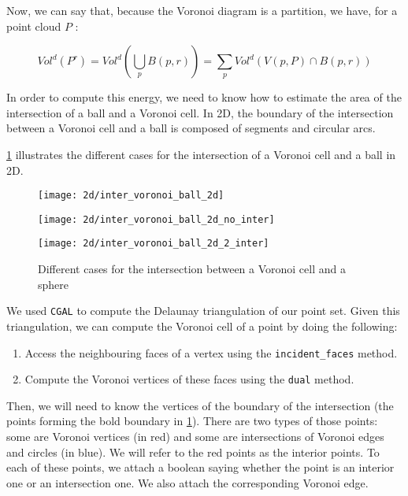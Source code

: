 Now, we can say that, because the Voronoi diagram is a partition, we have, for a
point cloud $ P $ :

$$ Vol^d(P^r) = Vol^d(\bigcup_p B(p, r)) = \sum_p Vol^d(V(p, P) \cap B(p, r)) $$

In order to compute this energy, we need to know how to estimate the area of the
intersection of a ball and a Voronoi cell. In 2D, the boundary of the
intersection between a Voronoi cell and a ball is composed of segments and
circular arcs.

\ref{fig:inter_voronoi_ball_2d} illustrates the different cases for the
intersection of a Voronoi cell and a ball in 2D.

\begin{figure}[h]
    \centering
    \begin{minipage}{0.32\linewidth}
        \centering
        \texttt{[image: 2d/inter\_voronoi\_ball\_2d]}
        \label{fig:inter_voronoi_ball_2d:a}
    \end{minipage}
    \begin{minipage}{0.32\linewidth}
        \centering
        \texttt{[image: 2d/inter\_voronoi\_ball\_2d\_no\_inter]}
        \label{fig:inter_voronoi_ball_2d:b}
    \end{minipage}
    \begin{minipage}{0.32\linewidth}
        \centering
        \texttt{[image: 2d/inter\_voronoi\_ball\_2d\_2\_inter]}
        \label{fig:inter_voronoi_ball_2d:c}
    \end{minipage}

   \caption{Different cases for the intersection between a Voronoi cell and a sphere}
   \label{fig:inter_voronoi_ball_2d}
\end{figure}

We used \texttt{CGAL} to compute the Delaunay triangulation of our point set.
Given this triangulation, we can compute the Voronoi cell of a point by doing
the following:
\begin{enumerate}
    \item Access the neighbouring faces of a vertex using the
        \texttt{incident\_faces} method.
    \item Compute the Voronoi vertices of these faces using the \texttt{dual}
        method.
\end{enumerate}

Then, we will need to know the vertices of the boundary of the intersection (the
points forming the bold boundary in \ref{fig:inter_voronoi_ball_2d}). There are
two types of those points: some are Voronoi vertices (in red) and some are
intersections of Voronoi edges and circles (in blue). We will refer to the red
points as the interior points. To each of these points, we attach a boolean
saying whether the point is an interior one or an intersection one. We also
attach the corresponding Voronoi edge.

